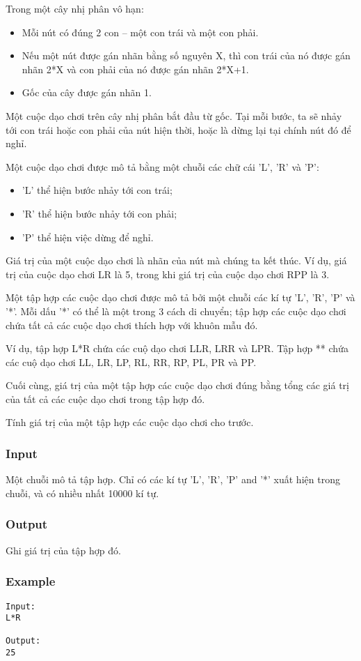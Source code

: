 



   Trong một cây nhị phân vô hạn:  
\begin{itemize}
	\item     Mỗi nút có đúng 2 con – một con trái và một con phải.   
	\item     Nếu một nút được gán nhãn bằng số nguyên X, thì con trái của nó được gán nhãn 2*X và con phải của nó được gán nhãn 2*X+1.   
	\item     Gốc của cây được gán nhãn 1.   
\end{itemize}

   Một  cuộc dạo chơi trên cây nhị phân bắt đầu từ gốc. Tại mỗi bước, ta sẽ nhảy tới con trái hoặc con phải của nút hiện thời, hoặc là dừng lại tại chính nút đó để nghỉ.  

   Một cuộc dạo chơi được mô tả bằng một chuỗi các chữ cái 'L', 'R' và 'P':  
\begin{itemize}
	\item     'L' thể hiện bước nhảy tới con trái;   
	\item     'R' thể hiện bước nhảy tới con phải;   
	\item     'P' thể hiện việc dừng để nghỉ.   
\end{itemize}

   Giá trị của một cuộc dạo chơi là nhãn của nút mà chúng ta kết thúc. Ví dụ, giá trị của cuộc dạo chơi LR là 5, trong khi giá trị của cuộc dạo chơi RPP là 3.  

   Một tập hợp các cuộc dạo chơi được mô tả bởi một chuỗi các kí tự 'L', 'R', 'P' và '*'. Mỗi dấu '*' có thể là một trong 3 cách di chuyển; tập hợp các cuộc dạo chơi chứa tất cả các cuộc dạo chơi thích hợp với khuôn mẫu đó.  

   Ví dụ, tập hợp L*R chứa các cuộ dạo chơi LLR, LRR và LPR. Tập hợp ** chứa các cuộ dạo chơi LL, LR, LP, RL, RR, RP, PL, PR và PP.  

   Cuối cùng, giá trị của một tập hợp các cuộc dạo chơi đúng bằng tổng các giá trị của tất cả các cuộc dạo chơi trong tập hợp đó.  

   Tính giá trị của một tập hợp các cuộc dạo chơi cho trước.  

\subsubsection{   Input  }

   Một chuỗi mô tả tập hợp. Chỉ có các kí tự 'L', 'R', 'P' and '*' xuất hiện trong chuỗi, và có nhiều nhất 10000 kí tự.  

\subsubsection{   Output  }

   Ghi giá trị của tập hợp đó.  

\subsubsection{   Example  }
\begin{verbatim}
Input:
L*R

Output:
25

\end{verbatim}